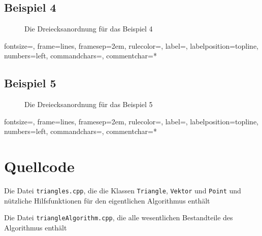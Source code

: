 \documentclass[a4paper, notitlepage, 12pt,headinclude]{scrartcl}
\newenvironment{longlisting}{\captionsetup{type=listing}}{}
\begin{document}
\subsection{Beispiel 4}
\begin{figure}[H] 
	
	\caption{Die Dreiecksanordnung für das Beispiel 4}
\end{figure}
%
{fontsize=\footnotesize,
	frame=lines,  %
	framesep=2em, %
	rulecolor=\color{Gray},
	label=,
	labelposition=topline,
	numbers=left,
	commandchars=\|\(\), %
	commentchar=*        %
}
\subsection{Beispiel 5}
\begin{figure}[H] 
	
	\caption{Die Dreiecksanordnung für das Beispiel 5}
\end{figure}
%
{fontsize=\footnotesize,
	frame=lines,  %
	framesep=2em, %
	rulecolor=\color{Gray},
	label=,
	labelposition=topline,
	numbers=left,
	commandchars=\|\(\), %
	commentchar=*        %
}
 \section{Quellcode}
 \renewcommand{\listingscaption}{Quellcode}
 
 \begin{longlisting}
 	
 	\caption{Die Datei \texttt{triangles.cpp}, die die Klassen \texttt{Triangle}, \texttt{Vektor} und \texttt{Point} und nützliche Hilfsfunktionen für den eigentlichen Algorithmus enthält}
 	
 	\caption{Die Datei \texttt{triangleAlgorithm.cpp}, die alle wesentlichen Bestandteile des Algorithmus enthält}
 \end{longlisting}
 
 
\end{document}
